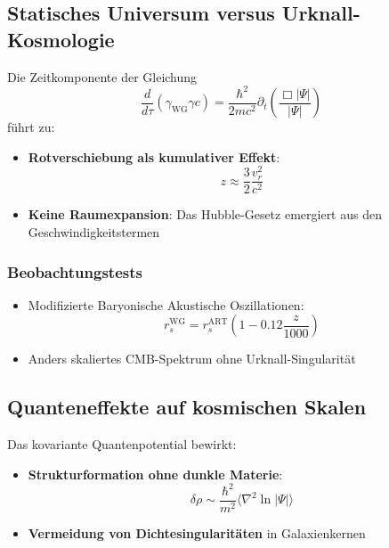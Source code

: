\subsection{Statisches Universum versus Urknall-Kosmologie}
Die Zeitkomponente der Gleichung
\begin{equation}
\frac{d}{d\tau}(\gamma_{\mathrm{WG}}\gamma c) = \frac{\hbar^2}{2mc^2}\partial_t\left(\frac{\Box|\Psi|}{|\Psi|}\right)
\end{equation}
führt zu:

\begin{itemize}
\item \textbf{Rotverschiebung als kumulativer Effekt}:
\begin{equation}
z \approx \frac{3}{2}\frac{v_r^2}{c^2}
\end{equation}

\item \textbf{Keine Raumexpansion}: Das Hubble-Gesetz emergiert aus den Geschwindigkeitstermen
\end{itemize}

\subsubsection{Beobachtungstests}
\begin{itemize}
\item Modifizierte Baryonische Akustische Oszillationen:
\begin{equation}
r_s^{\mathrm{WG}} = r_s^{\mathrm{ART}}\left(1 - 0.12\frac{z}{1000}\right)
\end{equation}

\item Anders skaliertes CMB-Spektrum ohne Urknall-Singularität
\end{itemize}

\subsection{Quanteneffekte auf kosmischen Skalen}
Das kovariante Quantenpotential bewirkt:

\begin{itemize}
\item \textbf{Strukturformation ohne dunkle Materie}:
\begin{equation}
\delta\rho \sim \frac{\hbar^2}{m^2}\langle \nabla^2\ln|\Psi|\rangle
\end{equation}

\item \textbf{Vermeidung von Dichtesingularitäten} in Galaxienkernen
\end{itemize}


